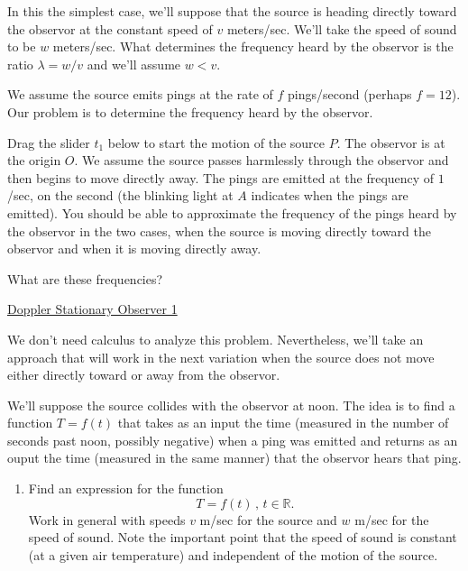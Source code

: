 \documentclass{ximera}
\begin{document}
\begin{example} \label{Exkdfksadfsdt4e4}

In this the simplest case, we'll suppose that the source is heading directly toward the observor at the constant speed of $v$ meters/sec. We'll take the speed of sound to be $w$ meters/sec. What determines the frequency heard by the observor is the ratio $\lambda = w/v$ and we'll assume $w<v$. 

We assume the source emits pings at the rate of $f$ pings/second (perhaps $f=12$). Our problem is to determine the frequency heard by the observor.

Drag the slider $t_1$ below to start the motion of the source $P$. The observor is at the origin $O$. We assume the source passes harmlessly through the observor and then begins to move directly away. The pings are emitted at the frequency of $1$/sec, on the second (the blinking light at $A$ indicates when the pings are emitted). You should be able to approximate the frequency of the pings heard by the observor in the two cases, when the source is moving directly toward the observor and when it is moving directly away. 

What are these frequencies?
\begin{freeResponse}
\end{freeResponse}


\begin{onlineOnly}
    \begin{center}
\end{center}
\end{onlineOnly}

\href{https://www.desmos.com/calculator/h2rw1sr8li}{Doppler Stationary Observer 1}

We don't need calculus to analyze this problem. Nevertheless, we'll take an approach that will work in the next variation when the source does not move either directly toward or away from the observor.

We'll suppose the source collides with the observor at noon. The idea is to find a function $T=f(t)$ that takes as an input the time (measured in the number of seconds past noon, possibly negative) when a ping was emitted and returns as an ouput the time (measured in the same manner) that the observor hears that ping.

\begin{enumerate}
\item Find an expression for the function 
\[
    T = f(t) \, , \, t \in \mathbb{R}.
\]
Work in general with speeds $v$ m/sec for the source and $w$ m/sec for the speed of sound. Note the important point that the speed of sound is constant (at a given air temperature) and independent of the motion of the source.


\end{enumerate}
\end{example}
\end{document}
